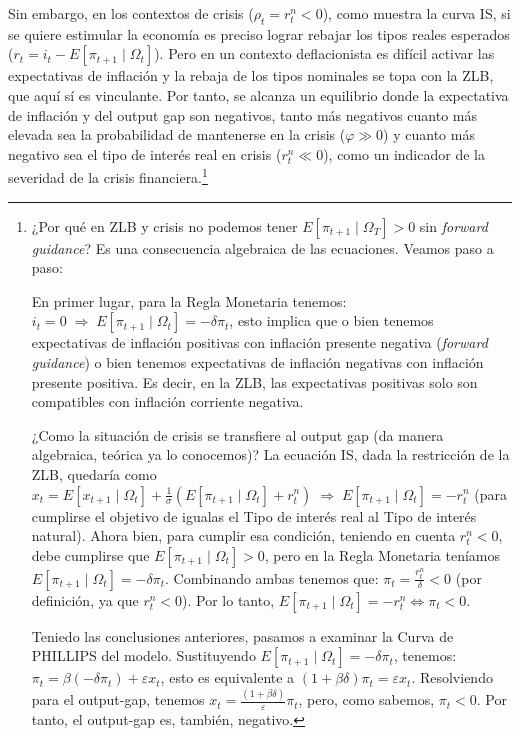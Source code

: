 \documentclass[10pt,a4paper]{article}
\begin{document}
Sin embargo, en los contextos de crisis ($\rho_t=r_t^n<0$), como muestra la curva IS, si se quiere estimular la economía es preciso lograr rebajar los tipos reales esperados ($r_t=i_t-E[\pi_{t+1}\;|\;\Omega_t]$). Pero en un contexto deflacionista es difícil activar las expectativas de inflación y la rebaja de los tipos nominales se topa con la ZLB, que aquí sí es vinculante. Por tanto, se alcanza un equilibrio donde la expectativa de inflación y del output gap son negativos, tanto más negativos cuanto más elevada sea la probabilidad de mantenerse en la crisis ($\varphi\gg0$) y cuanto más negativo sea el tipo de interés real en crisis ($r_t^n\ll0$), como un indicador de la severidad de la crisis financiera.\footnote{
¿Por qué en ZLB y crisis no podemos tener $E[\pi_{t+1}\;|\;\Omega_T]>0$ sin \textit{forward guidance}? Es una consecuencia algebraica de las ecuaciones. Veamos paso a paso:

En primer lugar, para la Regla Monetaria tenemos: $i_t=0\;\Rightarrow\;E[\pi_{t+1}\;|\;\Omega_t]=-\delta\pi_t$, esto implica que o bien tenemos expectativas de inflación positivas con inflación presente negativa (\textit{forward guidance}) o bien tenemos expectativas de inflación negativas con inflación presente positiva. Es decir, en la ZLB, las expectativas positivas solo son compatibles con inflación corriente negativa. 

¿Como la situación de crisis se transfiere al output gap (da manera algebraica, teórica ya lo conocemos)? La ecuación IS, dada la restricción de la ZLB, quedaría como $x_t=E[x_{t+1}\;|\;\Omega_t]+\frac{1}{\sigma}(E[\pi_{t+1}\;|\;\Omega_t]+r_t^n)\;\Rightarrow\;E[\pi_{t+1}\;|\;\Omega_t]=-r_t^n$ (para cumplirse el objetivo de igualas el Tipo de interés real al Tipo de interés natural). Ahora bien, para cumplir esa condición, teniendo en cuenta $r_t^n<0$, debe cumplirse que $E[\pi_{t+1}\;|\;\Omega_t]>0$, pero en la Regla Monetaria teníamos $E[\pi_{t+1}\;|\;\Omega_t]=-\delta\pi_t$. Combinando ambas tenemos que: $\pi_t=\frac{r_t^n}{\delta}<0$ (por definición, ya que $r_t^n<0$). Por lo tanto, $E[\pi_{t+1}\;|\;\Omega_t]=-r_t^n\iff\pi_t<0$.

Teniedo las conclusiones anteriores, pasamos a examinar la Curva de PHILLIPS del modelo. Sustituyendo $E[\pi_{t+1}\;|\;\Omega_t]=-\delta\pi_t$, tenemos: $\pi_t=\beta(-\delta\pi_t)+\varepsilon x_t$,  esto es equivalente a $(1+\beta\delta)\pi_t=\varepsilon x_t$. Resolviendo para el output-gap, tenemos $x_t=\frac{(1+\beta\delta)}{\varepsilon}\pi_t$, pero, como sabemos, $\pi_t<0$. Por tanto, el output-gap es, también, negativo.
}
\end{document}
